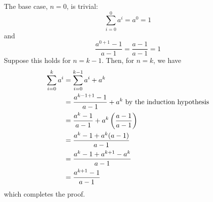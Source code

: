 \documentclass[draft]{article}
\begin{document}
\begin{solution}
    The base case, $n = 0$, is trivial:
    \[\sum_{i=0}^0 a^i = a^0  = 1\]
    and
    \[\frac{a^{0 + 1} - 1}{a - 1} = \frac{a - 1}{a - 1} = 1\]
    Suppose this holds for $n = k - 1$. Then, for $n = k$, we have
    \begin{align*}\sum_{i=0}^k a^i
         & = \sum_{i=0}^{k - 1} a^i + a^k                                              \\
         & = \frac{a^{k - 1 + 1} - 1}{a - 1} + a^k \hbox{ by the induction hypothesis} \\
         & = \frac{a^k - 1}{a - 1} + a^k\left(\frac{a - 1}{a - 1}\right)               \\
         & = \frac{a^k - 1 + a^k(a - 1)}{a - 1}                                        \\
         & = \frac{a^k - 1 + a^{k + 1} - a^k}{a - 1}                                   \\
         & = \frac{a^{k + 1} - 1}{a - 1}
    \end{align*}
    which completes the proof.
\end{solution}
\end{document}
